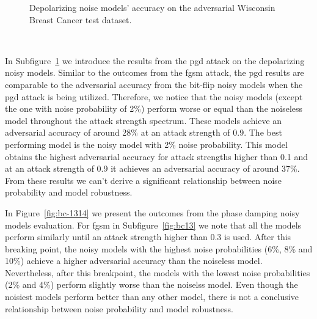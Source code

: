 \begin{figure}[!h]
\begin{subfigure}{0.45\textwidth}
      \label{fig:bc12}
  \end{subfigure}
  \caption{Depolarizing noise models' accuracy on the adversarial Wisconsin Breast Cancer test dataset.}
  \label{fig:bc-1112}
\end{figure} \

In Subfigure~\ref{fig:bc12} we introduce the results from the \ac{pgd}
attack on the depolarizing noisy models. Similar to the outcomes
from the \ac{fgsm} attack, the \ac{pgd} results are comparable to
the adversarial accuracy from the bit-flip noisy models when the \ac{pgd}
attack is being utilized. Therefore, we notice that the noisy models
(except the one with noise probability of 2\%) perform worse or equal
than the noiseless model throughout the attack strength spectrum. 
These models achieve an adversarial accuracy of around 28\% at
an attack strength of 0.9. The best performing model is the noisy
model with 2\% noise probability. This model obtains the highest
adversarial accuracy for attack strengths higher than 0.1 and
at an attack strength of 0.9 it achieves an adversarial accuracy
of around 37\%. From these results we can't derive a significant
relationship between noise probability and model robustness. \

In Figure~\ref{fig:bc-1314} we present the outcomes from the phase damping
noisy models evaluation. For \ac{fgsm} in Subfigure~\ref{fig:bc13}
we note that all the models perform similarly until an attack strength
higher than 0.3 is used. After this breaking point, the noisy models
with the highest noise probabilities (6\%, 8\% and 10\%) achieve
a higher adversarial accuracy than the noiseless model. Nevertheless,
after this breakpoint, the models with the lowest noise probabilities
(2\% and 4\%) perform slightly worse than the noiselss model. Even
though the noisiest models perform better than any other model, there
is not a conclusive relationship between noise probability and model
robustness. \

